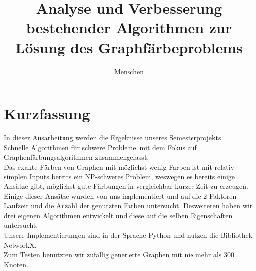 \documentclass[11pt]{article}
\title{Analyse und Verbesserung bestehender Algorithmen zur Lösung des Graphfärbeproblems}
\author{Menschen} %
\begin{document}
\newlength{\stdwidth}
\setlength{\stdwidth}{0.6\linewidth}
\maketitle

\tableofcontents
\newpage

\section{Kurzfassung} %

In dieser Ausarbeitung werden die Ergebnisse unseres Semesterprojekts\\
\grqq Schnelle Algorithmen für schwere Probleme\grqq\ mit dem Fokus auf
Graphenfärbungsalgorithmen zusammengefasst. \\ 
Das exakte Färben von Graphen mit möglichst wenig Farben ist mit relativ simplen Inputs bereits ein NP-schweres Problem, weswegen es bereits einige Ansätze gibt,
möglichst gute Färbungen in vergleichbar kurzer Zeit zu erzeugen. Einige dieser Ansätze wurden von uns implementiert und auf die $2$ Faktoren 
Laufzeit und die Anzahl der genutzten Farben untersucht.
Desweiteren haben wir drei eigenen Algorithmen entwickelt und diese auf die selben Eigenschaften untersucht. \\
Unsere Implementierungen sind in der Sprache Python und nutzen die Bibliothek NetworkX. \\
Zum Testen benutzten wir zufällig generierte Graphen mit nie mehr als $300$ Knoten. 
\end{document}

